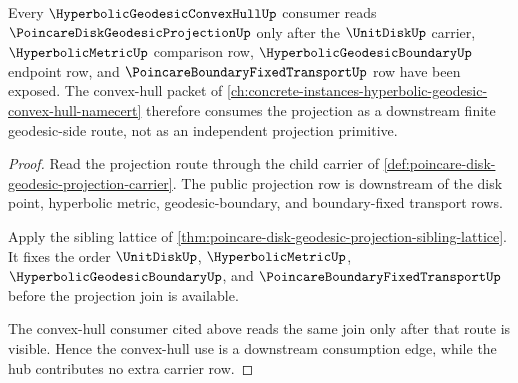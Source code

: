 \begin{theorem}
\label{thm:poincare-disk-geodesic-projection-convex-hull-consumption}
Every $\HyperbolicGeodesicConvexHullUp$ consumer reads $\PoincareDiskGeodesicProjectionUp$ only after the $\UnitDiskUp$ carrier, $\HyperbolicMetricUp$ comparison row, $\HyperbolicGeodesicBoundaryUp$ endpoint row, and $\PoincareBoundaryFixedTransportUp$ row have been exposed. The convex-hull packet of \autoref{ch:concrete-instances-hyperbolic-geodesic-convex-hull-namecert} therefore consumes the projection as a downstream finite geodesic-side route, not as an independent projection primitive.
\end{theorem}
\begin{proof}
Read the projection route through the child carrier of \autoref{def:poincare-disk-geodesic-projection-carrier}. The public projection row is downstream of the disk point, hyperbolic metric, geodesic-boundary, and boundary-fixed transport rows.

Apply the sibling lattice of \autoref{thm:poincare-disk-geodesic-projection-sibling-lattice}. It fixes the order $\UnitDiskUp$, $\HyperbolicMetricUp$, $\HyperbolicGeodesicBoundaryUp$, and $\PoincareBoundaryFixedTransportUp$ before the projection join is available.

The convex-hull consumer cited above reads the same join only after that route is visible. Hence the convex-hull use is a downstream consumption edge, while the hub contributes no extra carrier row.
\end{proof}

